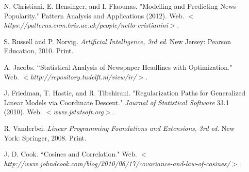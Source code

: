 \documentclass{article}
\begin{document}
\begin{thebibliography}{99}
N. Christiani, E. Hensinger, and I. Flaounas. "Modelling and Predicting News Popularity." Pattern Analysis and Applications (2012). Web. \emph{$<$https://patterns.enm.bris.ac.uk/people/nello-cristianini$>$}.

S. Russell and P. Norvig. \emph{Artificial Intelligence, 3rd ed}. New Jersey: Pearson Education, 2010. Print.

    A. Jacobs. ``Statistical Analysis of Newspaper Headlines with Optimization." Web. \emph{$<$http://repository.tudelft.nl/view/ir/$>$}.

    J. Friedman, T. Hastie, and R. Tibshirani. "Regularization Paths for Generalized Linear Models via Coordinate Descent." \emph{Journal of Statistical Software} 33.1 (2010). Web. \emph{$<$www.jstatsoft.org$>$}.

    R. Vanderbei. \emph{Linear Programming Foundations and Extensions, 3rd ed}. New York: Springer, 2008. Print.

J. D. Cook. ``Cosines and Correlation." Web. \emph{$<$http://www.johndcook.com/blog/2010/06/17/covariance-and-law-of-cosines/$>$}.
\end{thebibliography}
\end{document}
